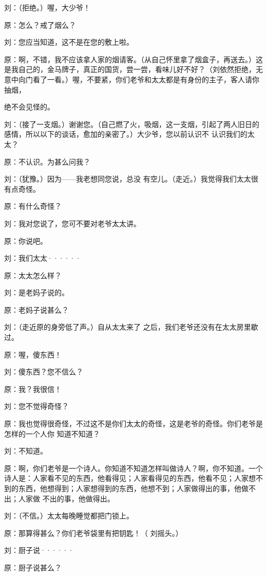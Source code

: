 \documentclass{article}
\begin{document}
刘：（拒绝。）喔，大少爷！ 


原：怎么？戒了烟么？ 


刘：您应当知道，这不是在您的敷上啦。 

原：啊，不错，我不应该拿人家的烟请客。（从自己怀里拿了烟盒子，再送去。）这是我自己的，金马牌子，真正的国货，尝一尝，看味儿好不好？（刘依然拒绝，无意中向门看了一看。）喔，不要紧，你们老爷和太太都是有身份的主子，客人请你抽烟，

\newpage
绝不会见怪的。 

刘：（接了一支烟。）谢谢您。（自己燃了火，吸烟，这一支烟，引起了两人旧日的感情，所以以下的谈话，愈加的亲密了。）大少爷，您以前认识不
认识我们的太太？ 


原：不认识。为甚么问我？ 

刘：（犹豫。）因为——我老想同您说，总没
有空儿。（走近。）我觉得我们太太很有点奇怪。 


原：有什么奇怪？ 


刘：我对您说了，您可不要对老爷太太讲。 


原：你说吧。 


刘：我们太太······ 


原：太太怎么样？ 

\newpage


刘：是老妈子说的。 


原：老妈子说甚么？ 

刘：（走近原的身旁低了声。）自从太太来了
之后，我们老爷还没有在太太房里歇过。 


原：喔，傻东西！ 


刘：傻东西？您不信么？ 


原：我？我很信！ 


刘：您不觉得奇怪？ 

原：我也觉得很奇怪，不过这不是你们太太的奇怪，这是老爷的奇怪。你们老爷是怎样的一个人你
知道不知道？ 


刘：不知道。 

\newpage

原：啊，你们老爷是一个诗人。你知道不知道怎样叫做诗人？啊，你不知道。一个诗人是：人家看不见的东西，他看得见；人家看得见的东西，他看不见；人家想不到的东西，他想得到；人家想得到的东西，他想不到；人家做得出的事，他做不出；人家做
不出的事，他做得出。 


刘：（不信。）太太每晚睡觉都把门锁上。 

原：那算得甚么？你们老爷袋里有把钥匙！（
刘摇头。） 


刘：厨子说······ 


原：厨子说甚么？ 
\end{document}
